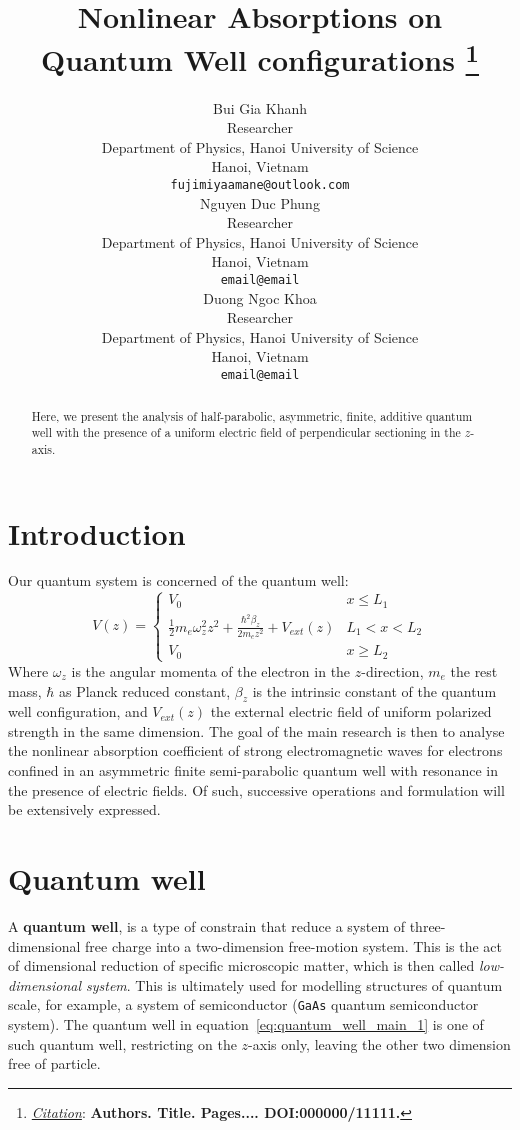 \documentclass{article}
\title{Nonlinear Absorptions on Quantum Well configurations
\thanks{\textit{\underline{Citation}}: 
\textbf{Authors. Title. Pages.... DOI:000000/11111.}} 
}
\author{
  Bui Gia Khanh\\
   Researcher \\
  Department of Physics, Hanoi University of Science \\
  Hanoi, Vietnam\\
  \texttt{fujimiyaamane@outlook.com} \\
   \AND
  Nguyen Duc Phung \\
   Researcher \\
   Department of Physics, Hanoi University of Science \\
  Hanoi, Vietnam\\
  \texttt{email@email} \\
  \And 
  Duong Ngoc Khoa \\
   Researcher \\
   Department of Physics, Hanoi University of Science \\
  Hanoi, Vietnam \\
  \texttt{email@email} 
}
\begin{document}
\maketitle

\begin{abstract}
    Here, we present the analysis of half-parabolic, asymmetric, finite, additive quantum well with the presence of a uniform electric field of perpendicular sectioning in the $z$-axis.   
\end{abstract}

\section{Introduction}
Our quantum system is concerned of the quantum well: 
\begin{equation}\label{eq:quantum_well_main_1}
    V(z)=\begin{cases}
        V_{0} & x \leq L_{1} \\
        \frac{1}{2}m_{{e}}\omega_{z}^{2}z^{2}+ \frac{\hbar^{2}\beta_{z}}{2m_{e}z^{2}} + V_{ext}(z) & L_{1} < x < L_{2}\\
        V_{0} & x \geq L_{2}
    \end{cases}
\end{equation}
Where $\omega_{z}$ is the angular momenta of the electron in the $z$-direction, $m_{e}$ the rest mass, $\hbar$ as Planck reduced constant, $\beta_{z}$ is the intrinsic constant of the quantum well configuration, and $V_{ext}(z)$ the external electric field of uniform polarized strength in the same dimension. The goal of the main research is then to analyse the nonlinear absorption coefficient of strong electromagnetic waves for electrons confined in an asymmetric finite semi-parabolic quantum well with resonance in the presence of electric fields. Of such, successive operations and formulation will be extensively expressed. 
\section{Quantum well}
A \textbf{quantum well}, is a type of constrain that reduce a system of three-dimensional free charge into a two-dimension free-motion system. This is the act of dimensional reduction of specific microscopic matter, which is then called \textit{low-dimensional system}. This is ultimately used for modelling structures of quantum scale, for example, a system of semiconductor (\texttt{GaAs} quantum semiconductor system). The quantum well in equation~\ref{eq:quantum_well_main_1} is one of such quantum well, restricting on the $z$-axis only, leaving the other two dimension free of particle. 
\end{document}
